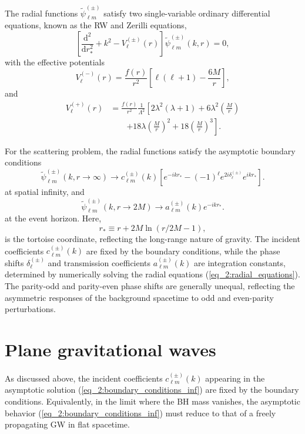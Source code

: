 \documentclass[reprint,amsmath,amssymb,aps,prd]{revtex4-2}
\newcommand{\dd}[0]{\mathrm{d}}
\begin{document}
The radial functions $\tilde{\psi}_{\ell m}^{(\pm)}$ satisfy two single-variable ordinary differential equations, known as the RW and Zerilli equations,
\begin{equation}
\label{eq_2:radial_equations}
\left[\frac{\dd^2}{\dd r_*^2}+k^2-V^{(\pm)}_{\ell}(r)\right]\tilde{\psi}^{(\pm)}_{\ell m}(k,r)=0,
\end{equation}
with the effective potentials
\begin{equation}
V^{(-)}_{\ell}(r)=\frac{f(r)}{r^2}\left[\ell(\ell+1)-\frac{6M}{r}\right],
\end{equation}
and
\begin{equation}
\begin{aligned}
V^{(+)}_{\ell}(r)&=\frac{f(r)}{r^2}\frac{1}{\Lambda^2}\left[2\lambda^2(\lambda+1)+6\lambda^2\left(\frac{M}{r}\right)\right.\\
&\qquad\left.+18\lambda\left(\frac{M}{r}\right)^2+18\left(\frac{M}{r}\right)^3\right].
\end{aligned}
\end{equation}

For the scattering problem, the radial functions satisfy the asymptotic boundary conditions
\begin{equation}
\label{eq_2:boundary_conditions_inf}
\tilde{\psi}_{\ell m}^{(\pm)}(k,r\rightarrow\infty)\rightarrow
c_{\ell m}^{(\pm)}(k)\left[e^{-ikr_*}-(-1)^{\ell}e^{2i\delta^{(\pm)}_{\ell}}e^{ikr_*}\right].
\end{equation}
at spatial infinity, and
\begin{equation}
\label{eq_2:boundary_conditions_horizon}
\tilde{\psi}_{\ell m}^{(\pm)}(k,r\rightarrow2M)\rightarrow
a_{\ell m}^{(\pm)}(k)e^{-ikr_*}.
\end{equation}
at the event horizon. Here,
\begin{equation}
r_*\equiv r+2M\ln(r/2M-1),
\end{equation}
is the tortoise coordinate, reflecting the long-range nature of gravity. The incident coefficients $c_{\ell m}^{(\pm)}(k)$ are fixed by the boundary conditions, while the phase shifts $\delta_{\ell}^{(\pm)}$ and transmission coefficients $a_{\ell m}^{(\pm)}(k)$ are integration constants, determined by numerically solving the radial equations (\ref{eq_2:radial_equations}). The parity-odd and parity-even phase shifts are generally unequal, reflecting the asymmetric responses of the background spacetime to odd and even-parity perturbations.

\section{\label{sec:planar_waves}Plane gravitational waves}
As discussed above, the incident coefficients $c_{\ell m}^{(\pm)}(k)$ appearing in the asymptotic solution (\ref{eq_2:boundary_conditions_inf}) are fixed by the boundary conditions. Equivalently, in the limit where the BH mass vanishes, the asymptotic behavior (\ref{eq_2:boundary_conditions_inf}) must reduce to that of a freely propagating GW in flat spacetime.
\end{document}
